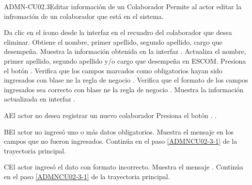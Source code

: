 \begin{UseCase}{ADMN-CU02.3}{Editar información de un Colaborador}{
	Permite al actor editar la infromación de un colaborador que está en el sistema.
}
	  

\end{UseCase}

\begin{UCtrayectoria}
	\UCpaso [\UCactor] Da clic en el ícono \IUEditar{} desde la interfaz  en el recuadro del colaborador que desea eliminar.
	\UCpaso [\UCsist] Obtiene el nombre, primer apellido, segundo apellido, cargo que desempeña.
	\UCpaso [\UCsist] Muestra la información obtenida en la interfaz .
	\UCpaso [\UCactor] \label{ADMNCU02-3-1} Actualiza el nombre, primer apellido, segundo apellido y/o cargo que desempeña en ESCOM.
	\UCpaso [\UCactor] Presiona el botón .
	\UCpaso Verifica que los campos marcados como obligatorios hayan sido ingresados con blase ne la regla de negocio .
	\UCpaso Verifica que el formato de los campos ingresados sea correcto con blase ne la regla de negocio .
    \UCpaso [\UCsist] Muestra la información actualizada en interfaz .
	
\end{UCtrayectoria}

\begin{UCtrayectoriaA}{A}{El actor no desea registrar un nuevo colaborador}
	\UCpaso [\UCsist] Presiona el botón .
	.
\end{UCtrayectoriaA} 

\begin{UCtrayectoriaA}{B}{El actor no ingresó uno o más datos obligatorios.}
	\UCpaso [\UCsist] Muestra el mensaje  en los campos que no fueron ingresados.
	\UCpaso [\UCsist] Continúa en el paso \ref{ADMNCU02-3-1} de la trayectoria principal.
\end{UCtrayectoriaA} 

\begin{UCtrayectoriaA}{C}{El actor ingresó el dato con formato incorrecto.}
	\UCpaso [\UCsist] Muestra el mensaje .
	\UCpaso [\UCsist] Continúa en el paso \ref{ADMNCU02-3-1} de la trayectoria principal.
\end{UCtrayectoriaA}



